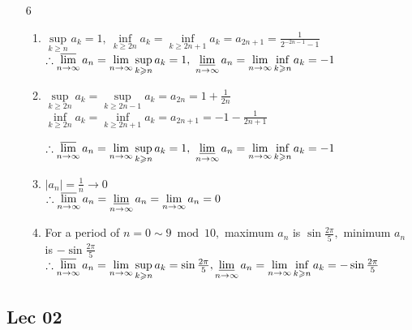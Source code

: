 \begin{enumerate}[1]
	\item[6]

\begin{enumerate}[(1)]
	\item 
	\(\sup \limits_{k \geqslant n} a_{k}=1,\  \inf \limits_{k \geqslant 2 n} a_{k}=\inf \limits_{k \geqslant 2 n+1} a_{k}=a_{2 n+1}=\frac{1}{2^{-2 n-1}-1}\)\\
	\(\therefore \varlimsup \limits_{n \rightarrow \infty}  a_{n}=\lim \limits_{n \rightarrow \infty} \sup \limits_{k \geqslant n} a_{k}=1, \ \varliminf \limits_{n \rightarrow \infty} a_{n}=\lim \limits_{n \rightarrow \infty} \inf \limits_{k \geqslant n} a_{k}=-1\)

	\item 
	\(\sup \limits_{k \geqslant 2 n} a_{k}=\sup \limits_{k \geqslant 2 n-1} a_{k}=a_{2 n}=1+\frac{1}{2 n}\)\\
	\(\inf \limits_{k \geqslant 2 n} a_{k}=\inf \limits_{k \geqslant 2 n+1} a_{k}=a_{2 n+1}=-1-\frac{1}{2 n+1}\)

	\(\therefore \varlimsup \limits_{n \rightarrow \infty}  a_{n} = \lim \limits_{n \rightarrow \infty} \sup \limits_{k \geqslant n} a_{k}=1,\  \varliminf \limits_{n \rightarrow \infty} a_{n}=\lim \limits_{n \rightarrow \infty} \inf \limits_{k \geqslant n} a_{k}=-1\)

	\item 
	\(\left|a_{n}\right|=\frac{1}{n} \rightarrow 0\)\\
	\(\therefore \varlimsup \limits_{n \rightarrow \infty} a_{n}=\varliminf \limits_{n \rightarrow \infty} a_{n}=\lim \limits_{n \rightarrow \infty} a_{n}=0\)

	\item 
	For a period of \(n=0 \sim 9 \bmod 10,\) maximum \(a_{n}\) is \(\sin \frac{2 \pi}{5},\) minimum \(a_{n}\) is
	\(-\sin \frac{2 \pi}{5}\)\\
	\(\therefore \varlimsup \limits_{n \rightarrow \infty} a_{n}=\lim \limits_{n \rightarrow \infty} \sup \limits_{k \geqslant n} a_{k}=\sin \frac{2 \pi}{5}, \varliminf \limits_{n \rightarrow \infty} a_{n}=\lim \limits_{n \rightarrow \infty} \inf \limits_{k \geqslant n} a_{k}=-\sin \frac{2 \pi}{5}\)

\end{enumerate}

\end{enumerate}

\subsection{Lec 02}

